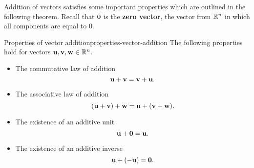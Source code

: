 Addition of vectors satisfies some important properties which are
outlined in the following theorem.  Recall that $\vect{0}$ is the
\textbf{zero vector}, the vector
from $\mathbb{R}^n$ in which all components are equal to $0$.

\begin{theorem}{Properties of vector addition}{properties-vector-addition}
  The following properties hold for vectors
  $\vect{u},\vect{v},\vect{w}\in\R^n$.%
  \begin{itemize}
  \item The commutative law of addition%
    \begin{equation*}
      \vect{u}+\vect{v}=\vect{v}+\vect{u}.
    \end{equation*}
  \item The associative law of addition
    \begin{equation*}
      (\vect{u}+\vect{v})+\vect{w} = \vect{u}+(\vect{v}+\vect{w}).
    \end{equation*}
  \item The existence of an additive unit%
    \begin{equation*}
      \vect{u}+\vect{0}=\vect{u}.
    \end{equation*}
  \item The existence of an additive inverse
    \begin{equation*}
      \vect{u}+(-\vect{u}) =\vect{0}.
    \end{equation*}
  \end{itemize}
\end{theorem}

